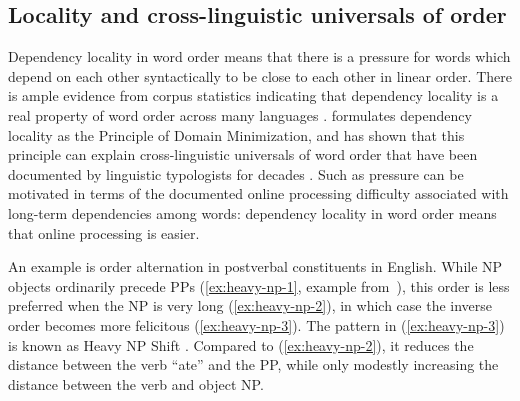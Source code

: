 

\subsection{Locality and cross-linguistic universals of order}

Dependency locality in word order means that there is a pressure for words which depend on each other syntactically to be close to each other in linear order.
There is ample evidence from corpus statistics indicating that dependency locality is a real property of word order across many languages \citep{gildea-optimizing-2007,liu2008dependency,gildea-grammars-2010,futrell-large-scale-2015,liu-dependency-2017,temperley-minimizing-2018}. 
\citet{hawkins-performance-1994,hawkins-efficiency-2003} formulates dependency locality as the Principle of Domain Minimization, and has shown that this principle can explain cross-linguistic universals of word order that have been documented by linguistic typologists for decades \citep{greenberg-universals-1963}. 
Such as pressure can be motivated in terms of the documented online processing difficulty associated with long-term dependencies among words: dependency locality in word order means that online processing is easier.

An example is order alternation in postverbal constituents in English.
While NP objects ordinarily precede PPs (\ref{ex:heavy-np-1}, example from~\citet{staub2006heavy}), this order is less preferred when the NP is very long (\ref{ex:heavy-np-2}), in which case the inverse order becomes more felicitous (\ref{ex:heavy-np-3}).
The pattern in (\ref{ex:heavy-np-3}) is known as Heavy NP Shift \citep{ross1967constraints,arnold2000heaviness,stallings2011s}.
Compared to (\ref{ex:heavy-np-2}), it reduces the distance between the verb ``ate'' and the PP, while only modestly increasing the distance between the verb and object NP.



